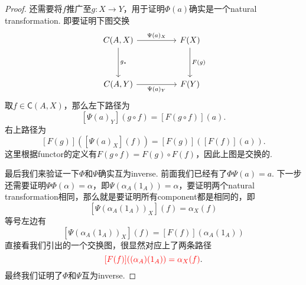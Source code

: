 \documentclass{article}
\newcommand*{\cat}[1]{\textsf{#1}\xspace}
\newcommand{\redt}[1]{\textcolor{red}{#1}}
\begin{document}
\begin{proof}
还需要将$f$推广至$g:X \to Y$，用于证明$\Phi(a)$确实是一个natural transformation. 即要证明下图交换
$$
\begin{tikzcd}
{C(A,X)} \arrow[rr, "\Psi(a)_X"] \arrow[dd, "g_*"] &  & F(X) \arrow[dd, "F(g)"] \\
                                                   &  &                         \\
{C(A,Y)} \arrow[rr, "\Psi(a)_Y"']                  &  & F(Y)                   
\end{tikzcd}
$$
取$f \in \cat{C}(A,X)$，那么左下路径为
$$
[\Psi(a)_Y](g \circ f) = [F(g \circ f)](a). 
$$
右上路径为
$$
[F(g)]([\Psi(a)_X](f)) = [F(g)]([F(f)](a)).
$$
这里根据functor的定义有$F(g \circ f) = F(g) \circ F(f)$，因此上图是交换的. 

最后我们来验证一下$\Phi$和$\Psi$确实互为inverse. 前面我们已经有了$\Phi\Psi(a) = a$. 下一步还需要证明$\Psi\Phi(\alpha) = \alpha$，即$\Psi(\alpha_A(1_A)) = \alpha$，要证明两个natural transformation相同，那么就是要证明所有component都是相同的，即
$$
[\Psi(\alpha_A(1_A))_X](f) = \alpha_X(f)
$$
等号左边有
$$
[\Psi(\alpha_A(1_A))_X](f) = [F(f)](\alpha_A(1_A))
$$
直接看我们引出的一个交换图，很显然对应上了两条路径
\begin{equation}
\redt{[F(f)]((\alpha_A)(1_A))=\alpha_X(f)}. \label{same composite}
\end{equation}
最终我们证明了$\Phi$和$\Psi$互为inverse. 
\end{proof}
\end{document}
